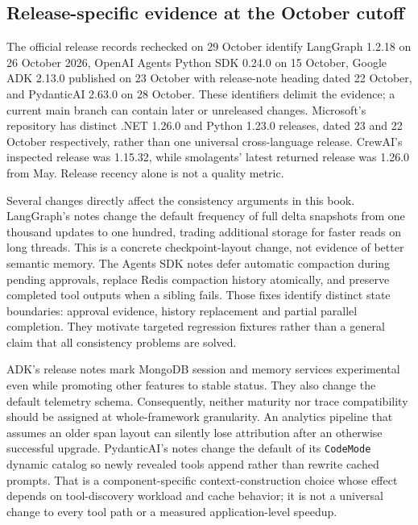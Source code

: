 \subsection{Release-specific evidence at the October cutoff}
The official release records rechecked on 29 October identify LangGraph 1.2.18 on 26 October 2026, OpenAI Agents Python SDK 0.24.0 on 15 October, Google ADK 2.13.0 published on 23 October with release-note heading dated 22 October, and PydanticAI 2.63.0 on 28 October\cite{executionrelease01,executionrelease02,executionrelease03,executionrelease04}. These identifiers delimit the evidence; a current main branch can contain later or unreleased changes. Microsoft's repository has distinct .NET 1.26.0 and Python 1.23.0 releases, dated 23 and 22 October respectively, rather than one universal cross-language release\cite{executionrelease05,cumb2026mafpython}. CrewAI's inspected release was 1.15.32, while smolagents' latest returned release was 1.26.0 from May\cite{executionrelease07,executionrelease06}. Release recency alone is not a quality metric.

Several changes directly affect the consistency arguments in this book. LangGraph's notes change the default frequency of full delta snapshots from one thousand updates to one hundred, trading additional storage for faster reads on long threads. This is a concrete checkpoint-layout change, not evidence of better semantic memory. The Agents SDK notes defer automatic compaction during pending approvals, replace Redis compaction history atomically, and preserve completed tool outputs when a sibling fails. Those fixes identify distinct state boundaries: approval evidence, history replacement and partial parallel completion. They motivate targeted regression fixtures rather than a general claim that all consistency problems are solved\cite{executionrelease01,executionrelease02}.

ADK's release notes mark MongoDB session and memory services experimental even while promoting other features to stable status. They also change the default telemetry schema. Consequently, neither maturity nor trace compatibility should be assigned at whole-framework granularity. An analytics pipeline that assumes an older span layout can silently lose attribution after an otherwise successful upgrade. PydanticAI's notes change the default of its \texttt{CodeMode} dynamic catalog so newly revealed tools append rather than rewrite cached prompts. That is a component-specific context-construction choice whose effect depends on tool-discovery workload and cache behavior; it is not a universal change to every tool path or a measured application-level speedup\cite{executionrelease03,executionrelease04}.


